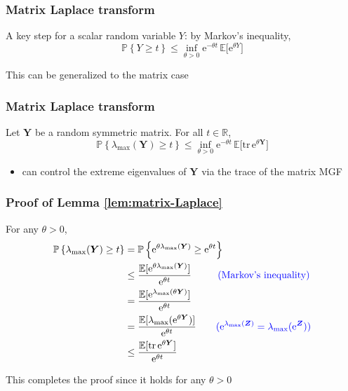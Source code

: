 \documentclass[compress,
mathserif,wide,%
]{beamer}
\begin{document}
\begin{frame}
\frametitle{Matrix Laplace transform}  

A key step for a scalar random variable $Y$: by Markov's inequality,
	\[
		\mathbb{P}\left\{ Y \geq t\right\} \leq \inf_{\theta>0} \mathrm{e}^{-\theta t} \,\mathbb{E}\big[\mathrm{e}^{\theta {Y}}\big]
	\]


\bigskip
\bigskip

This can be generalized to the matrix case

\end{frame}


\begin{frame}
\frametitle{Matrix Laplace transform} 


\begin{lemma}\label{lem:matrix-Laplace}
Let $\bm{Y}$ be a random symmetric matrix. For all $t\in\mathbb{R}$,
%
\[
	\mathbb{P}\left\{ \lambda_{\max}(\bm{Y}) \geq t\right\} \leq\inf_{\theta>0} \mathrm{e}^{-\theta t} \,\mathbb{E}\big[\mathrm{tr}\,\mathrm{e}^{\theta\bm{Y}}\big]
\]
%
\end{lemma}

\begin{itemize}
	\item can control the extreme eigenvalues of $\bm{Y}$ via the trace of the matrix MGF
\end{itemize}

\end{frame}




\begin{frame}
\frametitle{Proof of Lemma \ref{lem:matrix-Laplace}}  

For any $\theta>0$,
\begin{align*}
\mathbb{P}\left\{ \lambda_{\max}(\bm{Y})\geq t\right\}  & =\mathbb{P}\left\{ \mathrm{e}^{\theta\lambda_{\max}(\bm{Y})}\geq\mathrm{e}^{\theta t}\right\} \\
	& \leq\frac{\mathbb{E}[\mathrm{e}^{\theta\lambda_{\max}(\bm{Y})}]}{\mathrm{e}^{\theta t}}\qquad ~~\textcolor{blue}{ (\text{Markov's inequality})}\\
 	& =\frac{\mathbb{E}[\mathrm{e}^{\lambda_{\max}(\theta\bm{Y})}]}{\mathrm{e}^{\theta t}}\\
	& =\frac{\mathbb{E}[\lambda_{\max}(\mathrm{e}^{\theta\bm{Y}})]}{\mathrm{e}^{\theta t}}\qquad  \textcolor{blue}{ (\mathrm{e}^{\lambda_{\max}(\bm{Z})}=\lambda_{\max}(\mathrm{e}^{\bm{Z}}))}\\
 	& \leq\frac{\mathbb{E}[\mathrm{tr}\,\mathrm{e}^{\theta\bm{Y}}]}{\mathrm{e}^{\theta t}}
\end{align*}

This completes the proof since it holds for any $\theta>0$ 

\end{frame}
\end{document}
